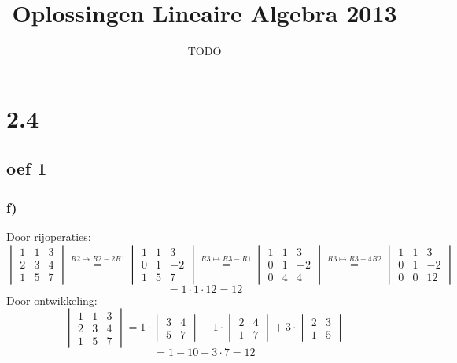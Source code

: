 \documentclass[10pt,a4paper]{article}
\title{Oplossingen Lineaire Algebra 2013}
\author{TODO}
\begin{document}
\maketitle
\pagebreak
\tableofcontents
\pagebreak

\section{2.4}
\subsection*{oef 1}
\subsubsection*{f)}
Door rijoperaties:
$$
\begin{vmatrix}
1 & 1 & 3\\
2 & 3 & 4\\
1 & 5 & 7
\end{vmatrix}
\overset{R2 \longmapsto R2-2R1}{=}
\begin{vmatrix}
1 & 1 & 3\\
0 & 1 & -2\\
1 & 5 & 7
\end{vmatrix}
\overset{R3 \longmapsto R3-R1}{=}
\begin{vmatrix}
1 & 1 & 3\\
0 & 1 & -2\\
0 & 4 & 4
\end{vmatrix}
\overset{R3 \longmapsto R3-4R2}{=}
\begin{vmatrix}
1 & 1 & 3\\
0 & 1 & -2\\
0 & 0 & 12
\end{vmatrix}
$$
$$ = 1\cdot 1 \cdot 12 = 12$$
Door ontwikkeling:
$$
\begin{vmatrix}
1 & 1 & 3\\
2 & 3 & 4\\
1 & 5 & 7
\end{vmatrix}
= 1 \cdot
\begin{vmatrix}
3 & 4\\
5 & 7
\end{vmatrix}
- 1 \cdot 
\begin{vmatrix}
2 & 4\\
1 & 7
\end{vmatrix}
+3\cdot
\begin{vmatrix}
2 & 3\\
1 & 5
\end{vmatrix}
$$
$$
= 1 - 10 + 3\cdot 7 = 12
$$
\end{document}
